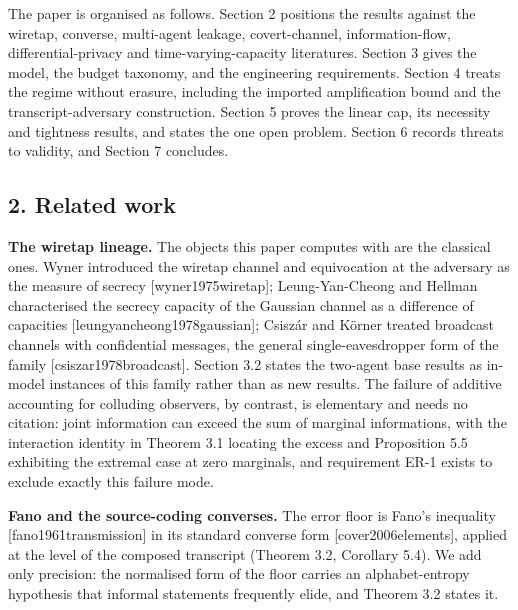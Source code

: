 \documentclass[
  11pt,
]{article}
\begin{document}
The paper is organised as follows. Section 2 positions the results
against the wiretap, converse, multi-agent leakage, covert-channel,
information-flow, differential-privacy and time-varying-capacity
literatures. Section 3 gives the model, the budget taxonomy, and the
engineering requirements. Section 4 treats the regime without erasure,
including the imported amplification bound and the transcript-adversary
construction. Section 5 proves the linear cap, its necessity and
tightness results, and states the one open problem. Section 6 records
threats to validity, and Section 7 concludes.

\subsection{2. Related work}\label{related-work}

\textbf{The wiretap lineage.} The objects this paper computes with are
the classical ones. Wyner introduced the wiretap channel and
equivocation at the adversary as the measure of secrecy
{[}wyner1975wiretap{]}; Leung-Yan-Cheong and Hellman characterised the
secrecy capacity of the Gaussian channel as a difference of capacities
{[}leungyancheong1978gaussian{]}; Csiszár and Körner treated broadcast
channels with confidential messages, the general single-eavesdropper
form of the family {[}csiszar1978broadcast{]}. Section 3.2 states the
two-agent base results as in-model instances of this family rather than
as new results. The failure of additive accounting for colluding
observers, by contrast, is elementary and needs no citation: joint
information can exceed the sum of marginal informations, with the
interaction identity in Theorem 3.1 locating the excess and Proposition
5.5 exhibiting the extremal case at zero marginals, and requirement ER-1
exists to exclude exactly this failure mode.

\textbf{Fano and the source-coding converses.} The error floor is Fano's
inequality {[}fano1961transmission{]} in its standard converse form
{[}cover2006elements{]}, applied at the level of the composed transcript
(Theorem 3.2, Corollary 5.4). We add only precision: the normalised form
of the floor carries an alphabet-entropy hypothesis that informal
statements frequently elide, and Theorem 3.2 states it.
\end{document}
